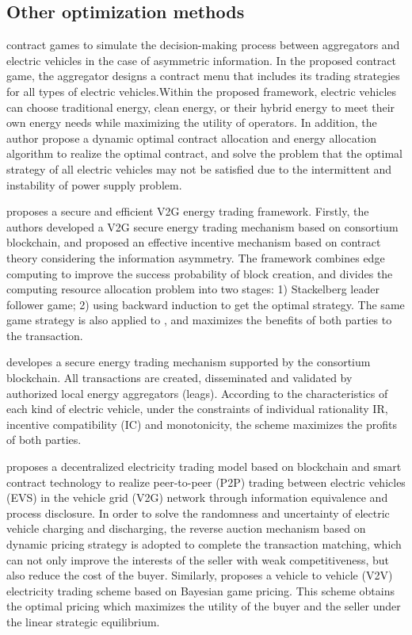 \subsection{Other optimization methods}
\cite{ref50} contract games to simulate the decision-making process between aggregators and electric vehicles in the case of asymmetric information. In the proposed contract game, the aggregator designs a contract menu that includes its trading strategies for all types of electric vehicles.Within the proposed framework, electric vehicles can choose traditional energy, clean energy, or their hybrid energy to meet their own energy needs while maximizing the utility of operators. In addition, the author  propose a dynamic optimal contract allocation and energy allocation algorithm to realize the optimal contract, and solve the problem that the optimal strategy of all electric vehicles may not be satisfied due to the intermittent and instability of power supply problem.

\cite{ref55} proposes a secure and efficient V2G energy trading framework. Firstly, the authors developed a V2G secure energy trading mechanism based on consortium blockchain, and proposed an effective incentive mechanism based on contract theory considering the information asymmetry. The framework combines edge computing to improve the success probability of block creation, and divides the computing resource allocation problem into two stages: 1) Stackelberg leader follower game; 2) using backward induction to get the optimal strategy. The same game strategy is also applied to \cite{ref41} \cite{ref66} \cite{ref84}, and maximizes the benefits of both parties to the transaction.

\cite{ref84} developes a secure energy trading mechanism supported by the consortium blockchain. All transactions are created, disseminated and validated by authorized local energy aggregators (leags). According to the characteristics of each kind of electric vehicle, under the constraints of individual rationality IR, incentive compatibility (IC) and monotonicity, the scheme maximizes the profits of both parties.

\cite{ref60} proposes a decentralized electricity trading model based on blockchain and smart contract technology to realize peer-to-peer (P2P) trading between electric vehicles (EVS) in the vehicle grid (V2G) network through information equivalence and process disclosure. In order to solve the randomness and uncertainty of electric vehicle charging and discharging, the reverse auction mechanism based on dynamic pricing strategy is adopted to complete the transaction matching, which can not only improve the interests of the seller with weak competitiveness, but also reduce the cost of the buyer. Similarly, \cite{ref62} proposes a vehicle to vehicle (V2V) electricity trading scheme based on Bayesian game pricing. This scheme obtains the optimal pricing which maximizes the utility of the buyer and the seller under the linear strategic equilibrium.

